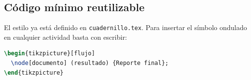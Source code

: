 \subsection{Código mínimo reutilizable}

El estilo ya está definido en \texttt{cuadernillo.tex}. Para insertar el
símbolo ondulado en cualquier actividad basta con escribir:

\begin{lstlisting}[language=TeX]
\begin{tikzpicture}[flujo]
  \node[documento] (resultado) {Reporte final};
\end{tikzpicture}
\end{lstlisting}
\thispagestyle{fancy}
